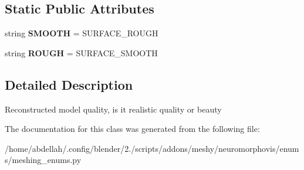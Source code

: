 \subsection*{Static Public Attributes}
\begin{DoxyCompactItemize}
\item 
string {\bfseries S\+M\+O\+O\+TH} = \textquotesingle{}S\+U\+R\+F\+A\+C\+E\+\_\+\+R\+O\+U\+GH\textquotesingle{}\hypertarget{classmeshy_1_1neuromorphovis_1_1enums_1_1meshing__enums_1_1Meshing_1_1Surface_a32bf130d4716ef6b463a68735ebc0887}{}\label{classmeshy_1_1neuromorphovis_1_1enums_1_1meshing__enums_1_1Meshing_1_1Surface_a32bf130d4716ef6b463a68735ebc0887}

\item 
string {\bfseries R\+O\+U\+GH} = \textquotesingle{}S\+U\+R\+F\+A\+C\+E\+\_\+\+S\+M\+O\+O\+TH\textquotesingle{}\hypertarget{classmeshy_1_1neuromorphovis_1_1enums_1_1meshing__enums_1_1Meshing_1_1Surface_a6d3e14a475de3f16c8bba2eeb46e8a46}{}\label{classmeshy_1_1neuromorphovis_1_1enums_1_1meshing__enums_1_1Meshing_1_1Surface_a6d3e14a475de3f16c8bba2eeb46e8a46}

\end{DoxyCompactItemize}


\subsection{Detailed Description}


\begin{DoxyVerb}Reconstructed model quality, is it realistic quality or beauty
\end{DoxyVerb}
 

The documentation for this class was generated from the following file\+:\begin{DoxyCompactItemize}
\item 
/home/abdellah/.\+config/blender/2./scripts/addons/meshy/neuromorphovis/enums/meshing\+\_\+enums.\+py\end{DoxyCompactItemize}

